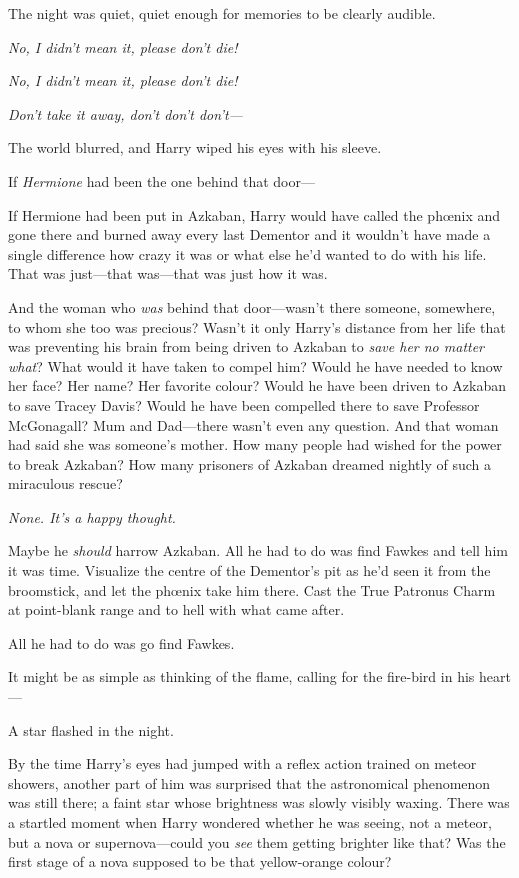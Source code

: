 The night was quiet, quiet enough for memories to be clearly audible.

\emph{No, I didn't mean it, please don't die!}

\emph{No, I didn't mean it, please don't die!}

\emph{Don't take it away, don't don't don't—}

The world blurred, and Harry wiped his eyes with his sleeve.

If \emph{Hermione} had been the one behind that door—

If Hermione had been put in Azkaban, Harry would have called the phœnix and gone there and burned away every last Dementor and it wouldn't have made a single difference how crazy it was or what else he'd wanted to do with his life. That was just—that was—that was just how it was.

And the woman who \emph{was} behind that door—wasn't there someone, somewhere, to whom she too was precious? Wasn't it only Harry's distance from her life that was preventing his brain from being driven to Azkaban to \emph{save her no matter what}? What would it have taken to compel him? Would he have needed to know her face? Her name? Her favorite colour? Would he have been driven to Azkaban to save Tracey Davis? Would he have been compelled there to save Professor McGonagall? Mum and Dad—there wasn't even any question. And that woman had said she was someone's mother. How many people had wished for the power to break Azkaban? How many prisoners of Azkaban dreamed nightly of such a miraculous rescue?

\emph{None. It's a happy thought.}

Maybe he \emph{should} harrow Azkaban. All he had to do was find Fawkes and tell him it was time. Visualize the centre of the Dementor's pit as he'd seen it from the broomstick, and let the phœnix take him there. Cast the True Patronus Charm at point-blank range and to hell with what came after.

All he had to do was go find Fawkes.

It might be as simple as thinking of the flame, calling for the fire-bird in his heart—

A star flashed in the night.

By the time Harry's eyes had jumped with a reflex action trained on meteor showers, another part of him was surprised that the astronomical phenomenon was still there; a faint star whose brightness was slowly visibly waxing. There was a startled moment when Harry wondered whether he was seeing, not a meteor, but a nova or supernova—could you \emph{see} them getting brighter like that? Was the first stage of a nova supposed to be that yellow-orange colour?

